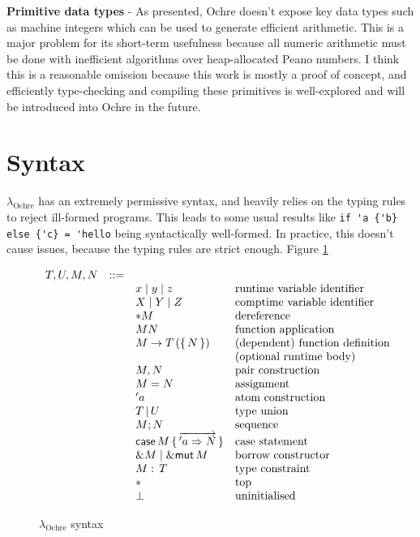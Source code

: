 \documentclass[12pt,twoside]{report}
\newcommand{\lochre}{$\lambda_\text{Ochre}$}
\begin{document}
\textbf{Primitive data types} - As presented, Ochre doesn't expose key data types such as machine integers which can be used to generate efficient arithmetic. This is a major problem for its short-term usefulness because all numeric arithmetic must be done with inefficient algorithms over heap-allocated Peano numbers. I think this is a reasonable omission because this work is mostly a proof of concept, and efficiently type-checking and compiling these primitives is well-explored and will be introduced into Ochre in the future.

\section{Syntax}
\lochre{} has an extremely permissive syntax, and heavily relies on the typing rules to reject ill-formed programs. This leads to some usual results like \verb|if 'a {'b} else {'c} = 'hello| being syntactically well-formed. In practice, this doesn't cause issues, because the typing rules are strict enough. Figure \ref{fig:syntax}

\begin{figure}
  \arraycolsep=1pt %
  \centering

  \vspace{-2ex} %
  \[
  \begin{array}[t]{llll}
    T, U, M, N & ::= & & \\
    && x\mid{}y\mid{}z & \text{runtime variable identifier}\\
    && X\mid{}Y\mid{}Z & \text{comptime variable identifier}\\
    && *M & \text{dereference}\\
    && M N & \text{function application}\\
    && M \rightarrow T\,(\{\,N\,\}) & \text{(dependent) function definition}\\
    && & \text{(optional runtime body)} \\
    && M, N & \text{pair construction}\\
    && M = N & \text{assignment}\\
    && 'a & \text{atom construction}\\
    && T\,|\,U & \text{type union}\\
    && M; N & \text{sequence}\\
    && \kw{case}\,M\,\{\,\overrightarrow{'a \Rightarrow N}\,\} & \text{case statement}\\
    && \&M \mid \&\kw{mut}\,M & \text{borrow constructor}\\
    && M:\,T & \text{type constraint}\\
    && * & \text{top}\\
    && \bot & \text{uninitialised}\\

  \end{array} %
  \]
\caption{\lochre{} syntax} %
\label{fig:syntax} %
\end{figure} %
\end{document}
